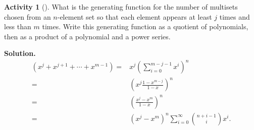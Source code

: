 \documentclass[10pt,]{book}
\theoremstyle{plain}
\theoremstyle{definition}
\newtheorem{activity}[project]{Activity}
\numberwithin{equation}{chapter}
\newcommand{\amp}{&}
\begin{document}
\begin{activity}[]\label{activity-187}
What is the generating function for the number of multisets chosen from an \(n\)-element set so that each element appears at least \(j\) times and less than \(m\) times. Write this generating function as a quotient of polynomials, then as a product of a polynomial and a power series.%
\par\medskip\noindent%
\textbf{Solution.}\quad %
\begin{align*}
(x^j+x^{j+1}+\cdots+x^{m-1}) =\amp x^j
\left(\sum_{i=0}^{m-j-1}x^i\right)^n\\
=\amp
\left(x^j\frac{1-x^{m-j}}{1-x}\right)^n\\
=\amp \left(\frac{x^j-x^m}{1-x}\right)^n\\
=\amp  (x^j-x^m)^n\sum_{i=0}^\infty \binom{n+i-1}{i}x^i.
\end{align*}
%
\end{activity}
\typeout{************************************************}
\typeout{************************************************}
\end{document}
